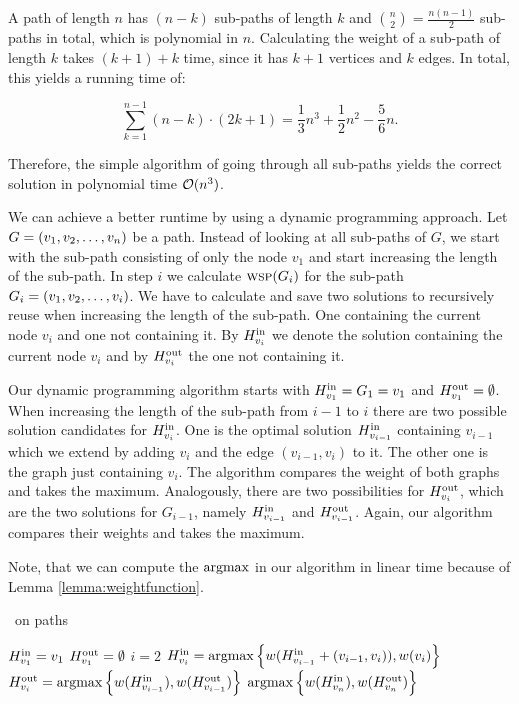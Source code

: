 A path of length $n$ has $(n-k)$ sub-paths of length $k$ and $\binom{n}{2} = \frac{n(n-1)}{2}$ sub-paths in total, which is polynomial in $n$. Calculating the weight of a sub-path of length $k$ takes $(k+1)+k$ time, since it has $k+1$ vertices and $k$ edges. In total, this yields a running time of:

$$\sum_{k=1}^{n-1} (n-k) \cdot (2k+1) = \frac{1}{3}n^3 + \frac{1}{2}n^2 - \frac{5}{6}n.$$ 

Therefore, the simple algorithm of going through all sub-paths yields the correct solution in polynomial time $\OO(n^3)$.\medskip

We can achieve a better runtime by using a dynamic programming approach. Let $G=\Vector[v]{n}$ be a path. Instead of looking at all sub-paths of $G$, we start with the sub-path consisting of only the node $v_1$ and start increasing the length of the sub-path. In step $i$ we calculate $\textsc{wsp}(G_i)$ for the sub-path $G_i = \Vector[v]{i}$. We have to calculate and save two solutions to recursively reuse when increasing the length of the sub-path. One containing the current node $v_i$ and one not containing it. By $\HPath{v_i}{in}$ we denote the solution containing the current node $v_i$ and by $\HPath{v_i}{out}$ the one not containing it.\medskip

Our dynamic programming algorithm starts with $\HPath{v_1}{in} = G_1 = v_1$ and $\HPath{v_1}{out} = \emptyset$. When increasing the length of the sub-path from $i-1$ to $i$ there are two possible solution candidates for $\HPath{v_i}{in}$. One is the optimal solution $\HPath{v_{i-1}}{in}$ containing $v_{i-1}$ which we extend by adding $v_i$ and the edge $(v_{i-1}, v_i)$ to it. The other one is the graph just containing $v_i$. The algorithm compares the weight of both graphs and takes the maximum. Analogously, there are two possibilities for $\HPath{v_{i}}{out}$, which are the two solutions for $G_{i-1}$, namely $\HPath{v_{i-1}}{in}$ and $\HPath{v_{i-1}}{out}$. Again, our algorithm compares their weights and takes the maximum.\medskip

Note, that we can compute the $\argmax$ in our algorithm in linear time because of Lemma \ref{lemma:weightfunction}.

\begin{algorithm}[H]
	\caption{\maxWSP\ on paths}
	\label{alg:wsppath}
	\begin{algorithmic}[1]
		\State $\HPath{v_1}{in} = v_1$
		\State $\HPath{v_1}{out} = \emptyset$
		\State $i=2$
		\State $\HPath{v_i}{in} = \argmax \Big\{ w(\HPath{v_{i-1}}{in} + (v_{i-1}, v_i)), w(v_i) \Big\}$
		\State $\HPath{v_i}{out} = \argmax \Big\{ w(\HPath{v_{i-1}}{in}), w(\HPath{v_{i-1}}{out}) \Big\}$
		\EndWhile
		\State\Return $\argmax \Big\{w(\HPath{v_n}{in}), w(\HPath{v_n}{out}) \Big\}$
		\EndProcedure
	\end{algorithmic}
\end{algorithm}

